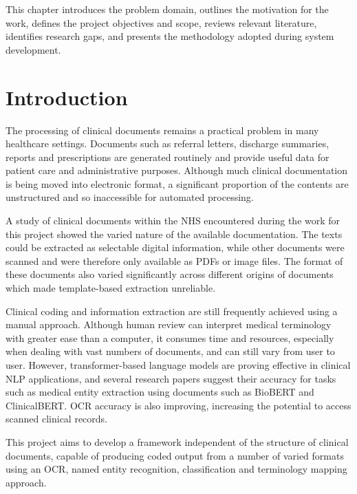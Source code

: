 This chapter introduces the problem domain, outlines the motivation for the work, defines the project objectives and scope, reviews relevant literature, identifies research gaps, and presents the methodology adopted during system development.

\section[Introduction]
{\textbf{Introduction}}

The processing of clinical documents remains a practical problem in many healthcare settings. Documents such as referral letters, discharge summaries, reports and prescriptions are generated routinely and provide useful data for patient care and administrative purposes. Although much clinical documentation is being moved into electronic format, a significant proportion of the contents are unstructured and so inaccessible for automated processing.

A study of clinical documents within the NHS encountered during the work for this project showed the varied nature of the available documentation. The texts could be extracted as selectable digital information, while other documents were scanned and were therefore only available as PDFs or image files. The format of these documents also varied significantly across different origins of documents which made template-based extraction unreliable.

Clinical coding and information extraction are still frequently achieved using a manual approach. Although human review can interpret medical terminology with greater ease than a computer, it consumes time and resources, especially when dealing with vast numbers of documents, and can still vary from user to user. However, transformer-based language models are proving effective in clinical NLP applications, and several research papers suggest their accuracy for tasks such as medical entity extraction using documents such as BioBERT and ClinicalBERT. OCR accuracy is also improving, increasing the potential to access scanned clinical records.

This project aims to develop a framework independent of the structure of clinical documents, capable of producing coded output from a number of varied formats using an OCR, named entity recognition, classification and terminology mapping approach.

